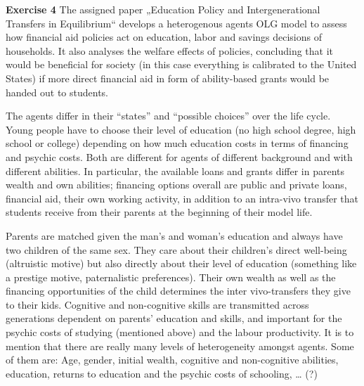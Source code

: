 \documentclass[12pt,a4paper,xcolor=dvipsnames]{article}
\begin{document}
\newpage

\textbf{Exercise 4}
The assigned paper „Education Policy and Intergenerational Transfers in Equilibrium“ develops a heterogenous agents OLG model to assess how financial aid policies act on education, labor and savings decisions of households. It also analyses the welfare effects of policies, concluding that it would be beneficial for society (in this case everything is calibrated to the United States) if more direct financial aid in form of ability-based grants would be handed out to students. 

The agents differ in their “states” and “possible choices” over the life cycle. Young people have to choose their level of education (no high school degree, high school or college) depending on how much education costs in terms of financing and psychic costs. Both are different for agents of different background and with different abilities. In particular, the available loans and grants differ in parents wealth and own abilities; financing options overall are public and private loans, financial aid, their own working activity, in addition to an intra-vivo transfer that students receive from their parents at the beginning of their model life. 

Parents are matched given the man’s and woman’s education and always have two children of the same sex. They care about their children’s direct well-being (altruistic motive) but also directly about their level of education (something like a prestige motive, paternalistic preferences). Their own wealth as well as the financing opportunities of the child determines the inter vivo-transfers they give to their kids. Cognitive and non-cognitive skills are transmitted across generations dependent on parents’ education and skills, and important for the psychic costs of studying (mentioned above) and the labour productivity. 
It is to mention that there are really many levels of heterogeneity amongst agents. Some of them are: Age, gender, initial wealth, cognitive and non-cognitive abilities, education, returns to education and the psychic costs of schooling, … (?)
\end{document}
